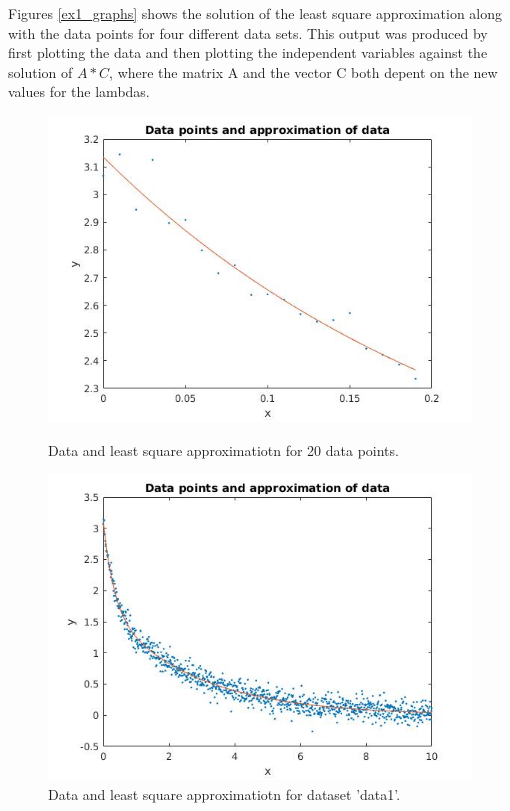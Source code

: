\documentclass[12pt]{article}
\begin{document}
Figures \ref{ex1_graphs} shows the solution of the least square approximation along with the data points for four different data sets. This output was produced by first plotting the data and then plotting the independent variables against the solution of $A * C$, where the matrix A and the vector C both depent on the new values for the lambdas.
\begin{figure}[H]
\parbox[t]{0.4\textwidth}{
	\includegraphics[width=\linewidth,natwidth=610,natheight=642]{ex1_testdata.jpg}
	\caption{Data and least square approximatiotn for 20 data points.}
}
\hfill
\parbox[t]{0.4\textwidth}{
	\includegraphics[width=\linewidth,natwidth=610,natheight=642]{ex1_data1.jpg}
	\caption {Data and least square approximatiotn for dataset 'data1'.}
}
\end{figure}
\end{document}
